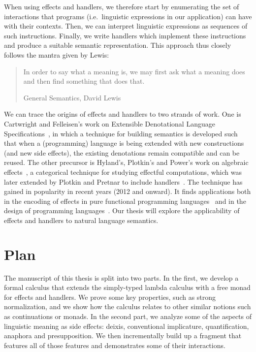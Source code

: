 When using effects and handlers, we therefore start by enumerating the set
of interactions that programs (i.e.\ linguistic expressions in our
application) can have with their contexts. Then, we can interpret
linguistic expressions as sequences of such instructions. Finally, we write
handlers which implement these instructions and produce a suitable semantic
representation. This approach thus closely follows the mantra given by
Lewis:

\begin{quote}
  In order to say what a meaning is, we may first ask what a meaning does
  and then find something that does that.

  \begin{flushright}
    General Semantics, David Lewis~\cite{lewis1970general}
  \end{flushright}
\end{quote}

We can trace the origins of effects and handlers to two strands of
work. One is Cartwright and Felleisen's work on Extensible Denotational
Language Specifications~\cite{cartwright1994extensible}, in which a
technique for building semantics is developed such that when a
(programming) language is being extended with new constructions (and new
side effects), the existing denotations remain compatible and can be
reused. The other precursor is Hyland's, Plotkin's and Power's work on
algebraic effects~\cite{hyland2006combining}, a categorical technique for
studying effectful computations, which was later extended by Plotkin and
Pretnar to include
handlers~\cite{plotkin2009handlers,pretnar2010logic,plotkin2013handling}. The
technique has gained in popularity in recent years (2012 and onward). It
finds applications both in the encoding of effects in pure functional
programming
languages~\cite{kiselyov2013extensible,kiselyov2015freer,kammar2013handlers,brady2013programming}
and in the design of programming
languages~\cite{bauer2012programming,lindley2016dobedobedo,dolan2015effective,kiselyov2016eff,hillerstrom2016compiling}. Our
thesis will explore the applicability of effects and handlers to natural
language semantics.


\section*{Plan}

The manuscript of this thesis is split into two parts. In the first, we
develop a formal calculus that extends the simply-typed lambda calculus
with a free monad for effects and handlers. We prove some key properties,
such as strong normalization, and we show how the calculus relates to other
similar notions such as continuations or monads. In the second part, we
analyze some of the aspects of linguistic meaning as side effects: deixis,
conventional implicature, quantification, anaphora and presupposition. We
then incrementally build up a fragment that features all of those features
and demonstrates some of their interactions.
